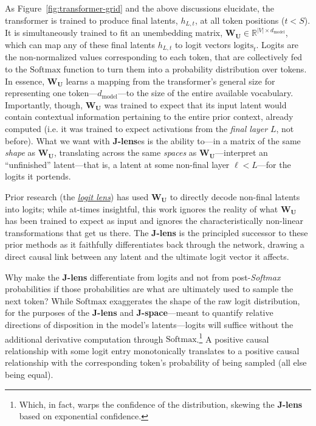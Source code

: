 \documentclass{article}
\newcommand{\logits}{\mathrm{logits}}
\newcommand{\smax}{\mathrm{Softmax}}
\newcommand{\dmodel}{d_{\text{model}}}
\begin{document}
As Figure~\ref{fig:transformer-grid} and the above discussions elucidate, the transformer is trained to produce final latents, \(h_{L,t}\), at all token positions (\(t < S\)). It is simultaneously trained to fit an unembedding matrix, \(\mathbf{W_U} \in \mathbb{R}^{|V| \times \dmodel}\), which can map any of these final latents \(h_{L, t}\) to logit vectors \(\logits_{t}\). Logits are the non-normalized values corresponding to each token, that are collectively fed to the \(\smax\) function to turn them into a probability distribution over tokens. In essence, \(\mathbf{W_U}\) learns a mapping from the transformer's general size for representing one token---\(\dmodel\)---to the size of the entire available vocabulary. Importantly, though, \(\mathbf{W_U}\) was trained to expect that its input latent would contain contextual information pertaining to the entire prior context, already computed (i.e. it was trained to expect activations from the \textit{final layer} \(L\), not before). What we want with \textbf{J-lens}es is the ability to---in a matrix of the same \textit{shape} as \(\mathbf{W_U}\), translating across the same \textit{spaces} as \(\mathbf{W_U}\)---interpret an ``unfinished'' latent---that is, a latent at some non-final layer \(\ell < L\)---for the logits it portends. 

Prior research (the \href{https://www.lesswrong.com/posts/AcKRB8wDpdaN6v6ru/interpreting-gpt-the-logit-lens}{\textit{logit lens}}) has used \(\mathbf{W_U}\) to directly decode non-final latents into logits; while at-times insightful, this work ignores the reality of what \(\mathbf{W_U}\) has been trained to expect as input and ignores the characteristically non-linear transformations that get us there. The \textbf{J-lens} is the principled successor to these prior methods as it faithfully differentiates back through the network, drawing a direct causal link between any latent and the ultimate logit vector it affects.


Why make the \textbf{J-lens} differentiate from logits and not from post-\textit{Softmax} probabilities if those probabilities are what are ultimately used to sample the next token? While \(\smax\) exaggerates the shape of the raw logit distribution, for the purposes of the \textbf{J-lens} and \textbf{J-space}---meant to quantify relative directions of disposition in the model's latents---logits will suffice without the additional derivative computation through \(\smax\).\footnote{Which, in fact, warps the confidence of the distribution, skewing the \textbf{J-lens} based on exponential confidence.} A positive causal relationship with some logit entry monotonically translates to a positive causal relationship with the corresponding token's probability of being sampled (all else being equal). 
\end{document}
